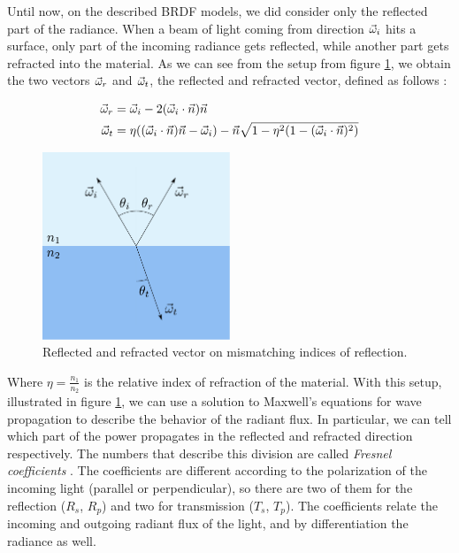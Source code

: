 Until now, on the described BRDF models, we did consider only the reflected part of the radiance. When a beam of light coming from direction $\vec{\omega}_i$ hits a surface, only part of the incoming radiance gets reflected, while another part gets refracted into the material. As we can see from the setup from figure \ref{fig:fresnelsetup}, we obtain the two vectors $\vec{\omega}_r$ and $\vec{\omega}_t$, the reflected and refracted vector, defined as follows \citep{Kay:1979:TCS:965103.807438}:

\begin{equation*}
\begin{split}
\vec{\omega}_r &= \vec{\omega}_i - 2 (\vec{\omega}_i \cdot \vec{n}) \vec{n} \\
\vec{\omega}_t &= \eta ((\vec{\omega}_i \cdot \vec{n}) \vec{n} - \vec{\omega}_i) - \vec{n} \sqrt{1 - \eta^2 (1 - (\vec{\omega}_i \cdot \vec{n}) ^ 2)}
\end{split}
\end{equation*}

\begin{figure}[!ht]
\centering
\includegraphics[width=0.5\textwidth]{images/fresnelsetup.pdf}
\caption{Reflected and refracted vector on mismatching indices of reflection.}
\label{fig:fresnelsetup}
\end{figure}
 

Where $\eta = \frac{n_1}{n_2}$ is the relative index of refraction of the material. With this setup, illustrated in figure \ref{fig:fresnelsetup}, we can use a solution to Maxwell's equations for wave propagation to describe the behavior of the radiant flux. In particular, we can tell which part of the power propagates in the reflected and refracted direction respectively. The numbers that describe this division are called \emph{Fresnel coefficients} \citep{ob:bornwolf}. The coefficients are different according to the polarization of the incoming light (parallel or perpendicular), so there are two of them for the reflection ($R_s$, $R_p$) and two for transmission ($T_s$, $T_p$). The coefficients relate the incoming and outgoing radiant flux of the light, and by differentiation the radiance as well.

